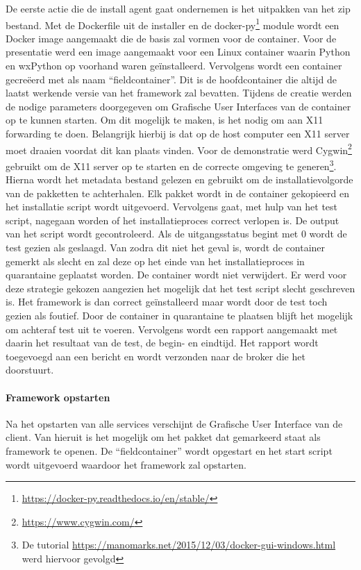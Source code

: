 De eerste actie die de install agent gaat ondernemen is het uitpakken van het zip bestand.
Met de Dockerfile uit de installer en de docker-py\footnote{\url{https://docker-py.readthedocs.io/en/stable/}} module wordt een Docker image aangemaakt die de basis zal vormen voor de container.
Voor de presentatie werd een image aangemaakt voor een Linux container waarin Python en wxPython op voorhand waren geïnstalleerd.
Vervolgens wordt een container gecreëerd met als naam ``fieldcontainer''.
Dit is de hoofdcontainer die altijd de laatst werkende versie van het framework zal bevatten.
Tijdens de creatie werden de nodige parameters doorgegeven om Grafische User Interfaces van de container op te kunnen starten.
Om dit mogelijk te maken, is het nodig om aan X11 forwarding te doen.
Belangrijk hierbij is dat op de host computer een X11 server moet draaien voordat dit kan plaats vinden.
Voor de demonstratie werd Cygwin\footnote{\url{https://www.cygwin.com/}} gebruikt om de X11 server op te starten en de correcte omgeving te generen\footnote{De tutorial \url{https://manomarks.net/2015/12/03/docker-gui-windows.html} werd hiervoor gevolgd}.
Hierna wordt het metadata bestand gelezen en gebruikt om de installatievolgorde van de pakketten te achterhalen.
Elk pakket wordt in de container gekopieerd en het installatie script wordt uitgevoerd.
Vervolgens gaat, met hulp van het test script, nagegaan worden of het installatieproces correct verlopen is.
De output van het script wordt gecontroleerd.
Als de uitgangsstatus begint met 0 wordt de test gezien als geslaagd.
Van zodra dit niet het geval is, wordt de container gemerkt als slecht en zal deze op het einde van het installatieproces in quarantaine geplaatst worden.
De container wordt niet verwijdert. 
Er werd voor deze strategie gekozen aangezien het mogelijk dat het test script slecht geschreven is.
Het framework is dan correct geïnstalleerd maar wordt door de test toch gezien als foutief.
Door de container in quarantaine te plaatsen blijft het mogelijk om achteraf test uit te voeren.
Vervolgens wordt een rapport aangemaakt met daarin het resultaat van de test, de begin- en eindtijd.
Het rapport wordt toegevoegd aan een bericht en wordt verzonden naar de broker die het doorstuurt.

\paragraph{Framework opstarten}
Na het opstarten van alle services verschijnt de Grafische User Interface van de client.
Van hieruit is het mogelijk om het pakket dat gemarkeerd staat als framework te openen.
De ``fieldcontainer'' wordt opgestart en het start script wordt uitgevoerd waardoor het framework zal opstarten.